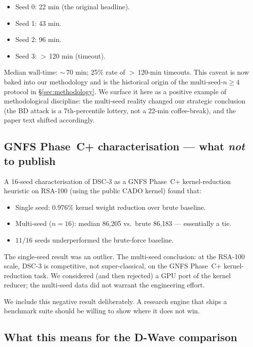 \documentclass[11pt,a4paper]{article}
\begin{document}
\begin{itemize}\itemsep0.1em
\item[$\bullet$] Seed 0: 22 min (the original headline).
\item[$\bullet$] Seed 1: 43 min.
\item[$\bullet$] Seed 2: 96 min.
\item[$\bullet$] Seed 3: $>$\,120 min (timeout).
\end{itemize}

Median wall-time: $\sim$\,70 min; 25\% rate of $>$\,120-min timeouts.
This caveat is now baked into our methodology and is the historical
origin of the multi-seed-$n\ge 4$ protocol in §\ref{sec:methodology}.
We surface it here as a positive example of methodological discipline:
the multi-seed reality changed our strategic conclusion (the BD attack
is a 7th-percentile lottery, not a 22-min coffee-break), and the paper
text shifted accordingly.

\subsection{GNFS Phase~C+ characterisation — what \emph{not} to publish}

A 16-seed characterisation of DSC-3 as a GNFS Phase~C+ kernel-reduction
heuristic on RSA-100 (using the public CADO kernel) found that:

\begin{itemize}\itemsep0.1em
\item Single seed: $0.976\%$ kernel weight reduction over brute baseline.
\item Multi-seed ($n=16$): median 86{,}205 vs.\ brute 86{,}183 ---
  essentially a tie.
\item $11/16$ seeds underperformed the brute-force baseline.
\end{itemize}

The single-seed result was an outlier. The multi-seed conclusion: at the
RSA-100 scale, DSC-3 is competitive, not super-classical, on the GNFS
Phase~C+ kernel-reduction task. We considered (and then rejected) a GPU
port of the kernel reducer; the multi-seed data did not warrant the
engineering effort.

We include this negative result deliberately. A research engine that
ships a benchmark suite should be willing to show where it does not win.

\subsection{What this means for the D-Wave comparison}
\end{document}
